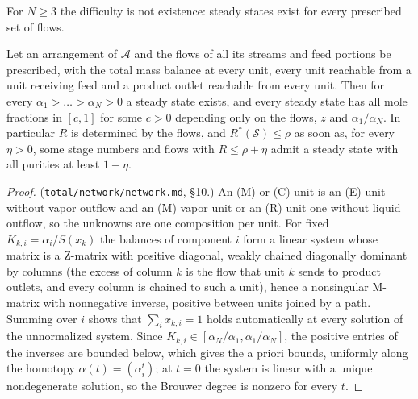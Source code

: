 For $N\ge3$ the difficulty is not existence: steady states exist for every prescribed set of flows.

\begin{proposition}\label{prop:exist}
Let an arrangement of $\mathcal A$ and the flows of all its streams and feed portions be prescribed, with the total mass
balance at every unit, every unit reachable from a unit receiving feed and a product outlet reachable from every
unit. Then for every $\alpha_1>\dots>\alpha_N>0$ a steady state exists, and every steady state has all mole fractions
in $[c,1]$ for some $c>0$ depending only on the flows, $z$ and $\alpha_1/\alpha_N$. In particular $R$ is determined by the
flows, and $R^*(\mathcal S)\le\rho$ as soon as, for every $\eta>0$, some stage numbers and flows with $R\le\rho+\eta$ admit
a steady state with all purities at least $1-\eta$.
\end{proposition}
\begin{proof}
(\texttt{total/network/network.md}, \S10.) An (M) or (C) unit is an (E) unit without vapor outflow and an (M) vapor
unit or an (R) unit one without liquid outflow, so the unknowns are one composition per unit. For fixed
$K_{k,i}=\alpha_i/S(x_k)$ the balances of component $i$ form a linear system whose matrix is a Z-matrix with positive
diagonal, weakly chained diagonally dominant by columns (the excess of column $k$ is the flow that unit $k$ sends to
product outlets, and every column is chained to such a unit), hence a nonsingular M-matrix with nonnegative inverse,
positive between units joined by a path. Summing over $i$ shows that $\sum_ix_{k,i}=1$ holds automatically at every
solution of the unnormalized system. Since $K_{k,i}\in[\alpha_N/\alpha_1,\alpha_1/\alpha_N]$, the positive entries of the
inverses are bounded below, which gives the a priori bounds, uniformly along the homotopy $\alpha(t)=(\alpha_i^t)$; at
$t=0$ the system is linear with a unique nondegenerate solution, so the Brouwer degree is nonzero for every $t$.
\end{proof}

